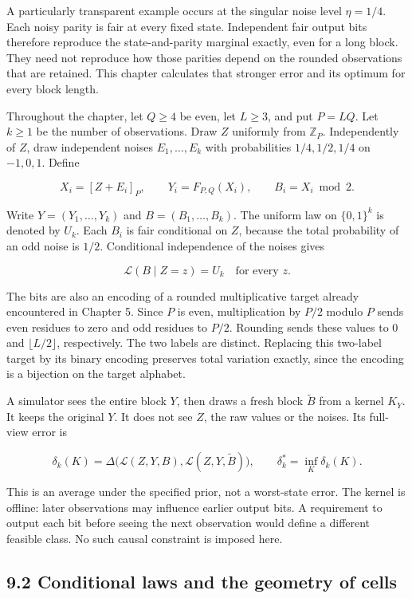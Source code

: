 \documentclass[
]{article}
\begin{document}
A particularly transparent example occurs at the singular noise level
\(\eta=1/4\). Each noisy parity is fair at every fixed state.
Independent fair output bits therefore reproduce the state-and-parity
marginal exactly, even for a long block. They need not reproduce how
those parities depend on the rounded observations that are retained.
This chapter calculates that stronger error and its optimum for every
block length.

Throughout the chapter, let \(Q\ge4\) be even, let \(L\ge3\), and put
\(P=LQ\). Let \(k\ge1\) be the number of observations. Draw \(Z\)
uniformly from \(\mathbb Z_P\). Independently of \(Z\), draw independent
noises \(E_1,\ldots,E_k\) with probabilities \(1/4,1/2,1/4\) on
\(-1,0,1\). Define

\[
X_i=[Z+E_i]_P,\qquad Y_i=F_{P,Q}(X_i),\qquad B_i=X_i\bmod2.
\]

Write \(Y=(Y_1,\ldots,Y_k)\) and \(B=(B_1,\ldots,B_k)\). The uniform law
on \(\{0,1\}^k\) is denoted by \(U_k\). Each \(B_i\) is fair conditional
on \(Z\), because the total probability of an odd noise is \(1/2\).
Conditional independence of the noises gives

\[
\mathcal L(B\mid Z=z)=U_k\quad\text{for every }z.
\]

The bits are also an encoding of a rounded multiplicative target already
encountered in Chapter 5. Since \(P\) is even, multiplication by \(P/2\)
modulo \(P\) sends even residues to zero and odd residues to \(P/2\).
Rounding sends these values to \(0\) and \(\lfloor L/2\rfloor\),
respectively. The two labels are distinct. Replacing this two-label
target by its binary encoding preserves total variation exactly, since
the encoding is a bijection on the target alphabet.

A simulator sees the entire block \(Y\), then draws a fresh block
\(\widetilde B\) from a kernel \(K_Y\). It keeps the original \(Y\). It
does not see \(Z\), the raw values or the noises. Its full-view error is

\[
\delta_k(K)=\Delta\bigl(\mathcal L(Z,Y,B),\mathcal L(Z,Y,\widetilde B)\bigr),
\qquad \delta_k^*=\inf_K\delta_k(K).
\]

This is an average under the specified prior, not a worst-state error.
The kernel is offline: later observations may influence earlier output
bits. A requirement to output each bit before seeing the next
observation would define a different feasible class. No such causal
constraint is imposed here.

\subsection{9.2 Conditional laws and the geometry of
cells}\label{conditional-laws-and-the-geometry-of-cells}
\end{document}
